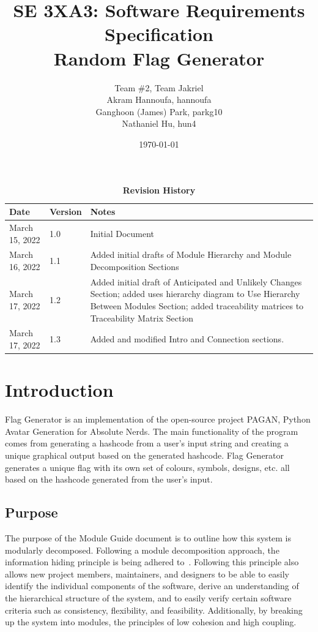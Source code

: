 \documentclass[12pt, titlepage]{article}
\title{SE 3XA3: Software Requirements Specification\\Random Flag Generator}
\author{Team \#2, Team Jakriel
		\\ Akram Hannoufa, hannoufa
		\\ Ganghoon (James) Park, parkg10
		\\ Nathaniel Hu, hun4
}
\date{\today}
\begin{document}
\maketitle

\tableofcontents
\listoftables
\listoffigures

\begin{table}[bp]
\caption{\bf Revision History}
\begin{tabularx}{\textwidth}{p{3cm}p{2cm}X}
\toprule {\bf Date} & {\bf Version} & {\bf Notes}\\
\midrule
March 15, 2022 & 1.0 & Initial Document\\
March 16, 2022 & 1.1 & Added initial drafts of Module Hierarchy and Module Decomposition Sections\\
March 17, 2022 & 1.2 & Added initial draft of Anticipated and Unlikely Changes Section; added uses hierarchy diagram to Use Hierarchy Between Modules Section; added traceability matrices to Traceability Matrix Section\\
March 17, 2022 & 1.3 & Added and modified Intro and Connection sections.\\
\bottomrule
\end{tabularx}
\end{table}

\newpage


\section{Introduction}
Flag Generator is an implementation of the open-source project PAGAN,
Python Avatar Generation for Absolute Nerds. The main functionality of the program
comes from generating a hashcode from a user's input string and creating a unique
graphical output based on the generated hashcode. Flag Generator generates a unique flag
with its own set of colours, symbols, designs, etc. all based on the hashcode generated from
the user's input.
\subsection{Purpose}
The purpose of the Module Guide document is to outline how this system is modularly 
decomposed. Following a module decomposition approach, the information hiding 
principle is being adhered to~\citep{Parnas1972a}. Following this principle also allows
new project members, maintainers, and designers to be able to easily identify the 
individual components of the software, derive an understanding of the hierarchical structure
of the system, and to easily verify certain software criteria such as consistency, flexibility,
 and feasibility. Additionally, by breaking up the system into modules, the principles
 of low cohesion and high coupling.
\end{document}
